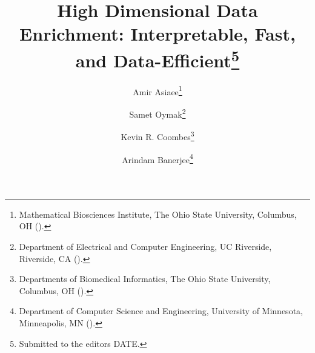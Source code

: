 
\title{High Dimensional Data Enrichment: Interpretable, Fast, and Data-Efficient\thanks{\color{red} Submitted to the editors DATE.
}}

\author{Amir Asiaee\thanks{Mathematical Biosciences Institute, The Ohio State University, Columbus, OH
  ().}
\and Samet Oymak\thanks{Department of Electrical and Computer Engineering, UC Riverside, Riverside, CA
  ().}
\and Kevin R. Coombes\thanks{Departments of Biomedical Informatics, The Ohio State University, Columbus, OH
	().}
\and Arindam Banerjee\thanks{Department of Computer Science and Engineering, University of Minnesota, Minneapolis, MN
	().}
}


\usepackage{amsopn}
\DeclareMathOperator{\diag}{diag}


